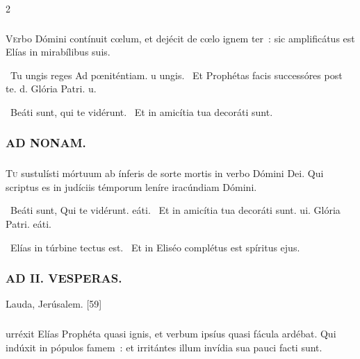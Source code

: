 \documentclass[9pt,twoside]{extarticle}
\begin{document}
\begin{multicols}{2}
{\subsubsection*{}
\lettrine{V}erbo Dómini contínuit cœlum, et dejécit de cœlo ignem ter~: sic amplificátus est Elías in mirabílibus suis.

\begin{tightlist}
\item {}~Tu ungis reges \textred{*} Ad pœniténtiam. u ungis. ~Et Prophétas facis successóres post te. d. Glória Patri. u.
\item {}~Beáti sunt, qui te vidérunt. ~Et in amicítia tua decoráti sunt.
\end{tightlist}

\subsubsection*{\center \textsc{AD NONAM.}}
\subsubsection*{}
\lettrine{T}u sustulísti mórtuum ab ínferis de sorte mortis in verbo Dómini Dei. Qui scriptus es in judíciis témporum leníre iracúndiam Dómini.

\begin{tightlist}
\item {}~Beáti sunt, \textred{*} Qui te vidérunt. eáti. ~Et in amicítia tua decoráti sunt. ui. Glória Patri. eáti.
\item {}~Elías in túrbine tectus est. ~Et in Eliséo complétus est spíritus ejus.
\end{tightlist}

\subsubsection*{\center \textsc{AD II. VESPERAS.}}
\begin{tightlist}
\item {} Lauda, Jerúsalem. [59]
\end{tightlist}

\subsubsection*{}
urréxit Elías Prophéta quasi ignis, et verbum ipsíus quasi fácula ardébat. Qui indúxit in pópulos famem~: et irritántes illum invídia sua pauci facti sunt.

}
\end{multicols}
\end{document}
